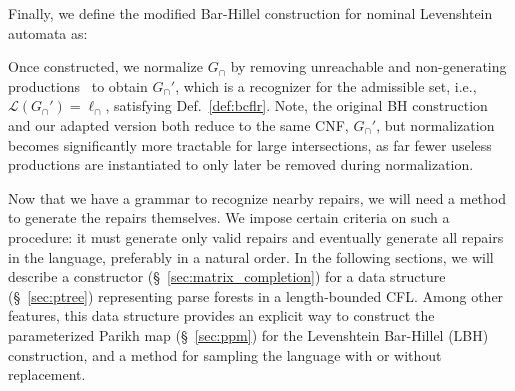 \documentclass[sigplan,acmsmall,nonacm,screen]{acmart}\settopmatter{printfolios=false,printccs=false,printacmref=false}
\begin{document}
  Finally, we define the modified Bar-Hillel construction for nominal Levenshtein automata as:\vspace{-2pt}

  \vspace{2pt}

  \noindent Once constructed, we normalize $G_\cap$ by removing unreachable and non-generating productions~\cite{firsov2015certified} to obtain $G_\cap'$, which is a recognizer for the admissible set, i.e., $\mathcal{L}(G_\cap') = \ell_\cap$, satisfying Def.~\ref{def:bcflr}. Note, the original BH construction and our adapted version both reduce to the same CNF, $G_\cap'$, but normalization becomes significantly more tractable for large intersections, as far fewer useless productions are instantiated to only later be removed during normalization.



  Now that we have a grammar to recognize nearby repairs, we will need a method to generate the repairs themselves. We impose certain criteria on such a procedure: it must generate only valid repairs and eventually generate all repairs in the language, preferably in a natural order. In the following sections, we will describe a constructor (\S~\ref{sec:matrix_completion}) for a data structure (\S~\ref{sec:ptree}) representing parse forests in a length-bounded CFL. Among other features, this data structure provides an explicit way to construct the parameterized Parikh map (\S~\ref{sec:ppm}) for the Levenshtein Bar-Hillel (LBH) construction, and a method for sampling the language with or without replacement.
\end{document}
